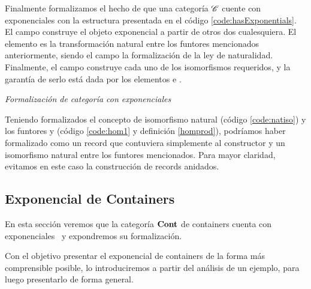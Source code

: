 Finalmente formalizamos el hecho de que una categoría $\mathscr{C}$ cuente con exponenciales con la estructura presentada en el código \ref{code:hasExponentials}. El campo  construye el objeto exponencial a partir de otros dos cualesquiera. El elemento  es la transformación natural entre los funtores mencionados anteriormente, siendo el campo  la formalización de la ley de naturalidad. Finalmente, el campo  construye cada uno de los isomorfismos requeridos, y la garantía de serlo está dada por los elementos  e . 

\begin{agdacode}{\it Formalización de categoría con exponenciales}\label{code:hasExponentials}
 
\end{agdacode}

\begin{remark} Teniendo formalizados el concepto de isomorfismo natural (código \ref{code:natiso}) y los funtores  y  (código \ref{code:hom1} y definición \ref{homprod}), podríamos haber formalizado  como un record que contuviera simplemente al constructor  y un isomorfismo natural entre los funtores mencionados. Para mayor claridad, evitamos en este caso la construcción de records anidados.   
\end{remark}

\subsection{Exponencial de Containers}
En esta sección veremos que la categoría $\mathbf{Cont}$ de containers cuenta con exponenciales~\cite{alti:2010} y expondremos su formalización.

Con el objetivo presentar el exponencial de containers de la forma más comprensible posible, lo introduciremos a partir del análisis de un ejemplo, para luego presentarlo de forma general.

